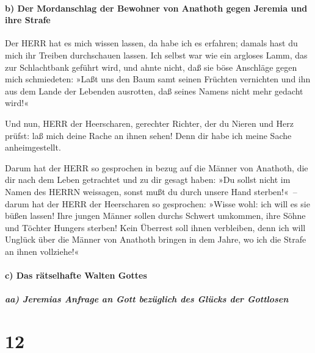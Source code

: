\hypertarget{b-der-mordanschlag-der-bewohner-von-anathoth-gegen-jeremia-und-ihre-strafe}{%
\paragraph{b) Der Mordanschlag der Bewohner von Anathoth gegen Jeremia
und ihre
Strafe}\label{b-der-mordanschlag-der-bewohner-von-anathoth-gegen-jeremia-und-ihre-strafe}}

Der HERR hat es mich wissen lassen, da habe ich es
erfahren; damals hast du mich ihr Treiben durchschauen lassen.
Ich selbst war wie ein argloses Lamm, das zur
Schlachtbank geführt wird, und ahnte nicht, daß sie böse Anschläge gegen
mich schmiedeten: »Laßt uns den Baum samt seinen Früchten vernichten und
ihn aus dem Lande der Lebenden ausrotten, daß seines Namens nicht mehr
gedacht wird!«

Und nun, HERR der Heerscharen, gerechter Richter, der du
Nieren und Herz prüfst: laß mich deine Rache an ihnen sehen! Denn dir
habe ich meine Sache anheimgestellt.

Darum hat der HERR so gesprochen in bezug auf die Männer
von Anathoth, die dir nach dem Leben getrachtet und zu dir gesagt haben:
»Du sollst nicht im Namen des HERRN weissagen, sonst mußt du durch
unsere Hand sterben!«~-- darum hat der HERR der
Heerscharen so gesprochen: »Wisse wohl: ich will es sie büßen lassen!
Ihre jungen Männer sollen durchs Schwert umkommen, ihre Söhne und
Töchter Hungers sterben! Kein Überrest soll ihnen
verbleiben, denn ich will Unglück über die Männer von Anathoth bringen
in dem Jahre, wo ich die Strafe an ihnen vollziehe!«

\hypertarget{c-das-ruxe4tselhafte-walten-gottes}{%
\paragraph{c) Das rätselhafte Walten
Gottes}\label{c-das-ruxe4tselhafte-walten-gottes}}

\hypertarget{aa-jeremias-anfrage-an-gott-bezuxfcglich-des-gluxfccks-der-gottlosen}{%
\subparagraph{aa) Jeremias Anfrage an Gott bezüglich des Glücks der
Gottlosen}\label{aa-jeremias-anfrage-an-gott-bezuxfcglich-des-gluxfccks-der-gottlosen}}

\hypertarget{section-11}{%
\section{12}\label{section-11}}

